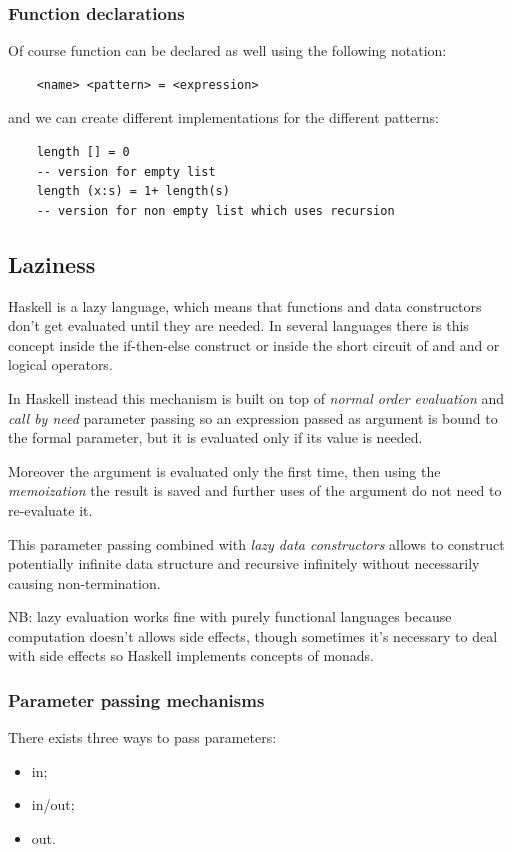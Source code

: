 \subsubsection{Function declarations}
Of course function can be declared as well using the following notation:
\begin{verbatim}
    <name> <pattern> = <expression>
\end{verbatim}
and we can create different implementations for the different patterns:
\begin{verbatim}
    length [] = 0
    -- version for empty list
    length (x:s) = 1+ length(s)
    -- version for non empty list which uses recursion
\end{verbatim}


\subsection{Laziness}
Haskell is a lazy language, which means that functions and data constructors don't get evaluated until they are needed. 
In several languages there is this concept inside the if-then-else construct or inside the short circuit of and and or logical operators.

In Haskell instead this mechanism is built on top of \emph{normal order evaluation} and \emph{call by need} parameter passing so an expression passed as argument is bound to the formal parameter, but it is evaluated only if its value is needed.

Moreover the argument is evaluated only the first time, then using the \emph{memoization} the result is saved and further uses of the argument do not need to re-evaluate it.

This parameter passing combined with \emph{lazy data constructors} allows to construct potentially infinite data structure and recursive infinitely without necessarily causing non-termination.

NB: lazy evaluation works fine with purely functional languages because computation doesn't allows side effects, though sometimes it's necessary to deal with side effects so Haskell implements concepts of monads.

\subsubsection{Parameter passing mechanisms}
There exists three ways to pass parameters:
\begin{itemize}
    \item in;
    \item in/out;
    \item out.
\end{itemize}

